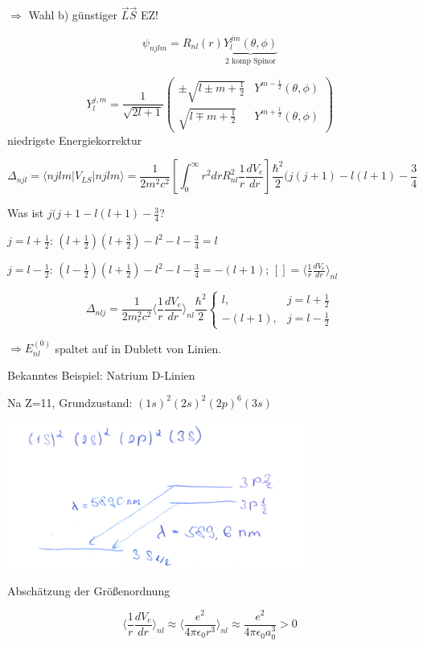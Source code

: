 \(\Rightarrow\) Wahl b) günstiger \(\vec L\vec S\) EZ!

\[ \psi_{njlm} = R_{nl}(r)\underbrace{Y^{jm}_l (\theta,\phi)}_{\text{2 komp Spinor}}\]

\[ Y^{j,m}_l = \frac{1}{\sqrt{2l+1}}\begin{pmatrix} 
  \pm\sqrt{l\pm m+\frac{1}{2}} & Y^{m-\frac{1}{2}}(\theta,\phi) \\
  \sqrt{l\mp m+\frac{1}{2}} & Y^{m+\frac{1}{2}}(\theta,\phi)
\end{pmatrix}
\]
niedrigste Energiekorrektur

\[ \Delta_{njl} = \langle njlm | V_{LS} | njlm\rangle = \frac{1}{2m^2c^2}\left[ \int^\infty_0 r^2 dr R^2_{nl}\frac{1}{r}\frac{dV_e}{dr} \right] \frac{\hbar^2}{2} (j(j+1)-l(l+1)-\frac{3}{4}\]

Was ist \(j(j+1-l(l+1)-\frac{3}{4}\)?

\(j=l+\frac{1}{2}\): \((l+\frac{1}{2})(l+\frac{3}{2})-l^2-l-\frac{3}{4} = l\)

\(j=l-\frac{1}{2}\): \((l-\frac{1}{2})(l+\frac{1}{2})-l^2-l-\frac{3}{4} = -(l+1)\); \([]=\langle \frac{1}{r}\frac{dV_e}{dr}\rangle_{nl}\)

\[ \Delta_{nlj} = \frac{1}{2m^2_e c^2}\langle \frac{1}{r}\frac{dV_e}{dr}\rangle_{nl}\frac{\hbar^2}{2}\begin{cases}
  l,  & j=l+\frac{1}{2}\\
  -(l+1), & j=l-\frac{1}{2}
\end{cases} \]

\(\Rightarrow E^{(0)}_{nl}\) spaltet auf in Dublett von Linien.

Bekanntes Beispiel: Natrium D-Linien

Na Z=11, Grundzustand: \((1s)^2(2s)^2(2p)^6(3s)\)

\includegraphics[width=0.75\textwidth]{kap03_02.png}

Abschätzung der Größenordnung

\[\langle \frac{1}{r}\frac{dV_e}{dr}\rangle_{nl} \approx \langle \frac{e^2}{4\pi \epsilon_0 r^3}\rangle_{nl}\approx  \frac{e^2}{4\pi \epsilon_0 a^3_0} > 0 \]

